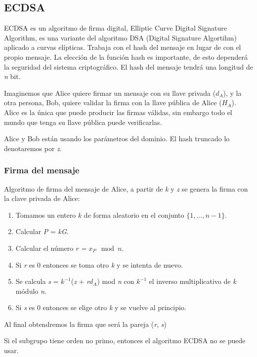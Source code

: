 \documentclass[11pt]{article}
\begin{document}
\subsection{ECDSA}

ECDSA es un algoritmo de firma digital, Elliptic Curve Digital Signature Algorithm, es una variante del algoritmo DSA (Digital Signature Algortihm) aplicado a curvas elípticas. Trabaja con el hash del mensaje en lugar de con el propio mensaje. La elección de la función hash es importante, de esto dependerá la seguridad del sistema criptográfico. El hash del mensaje tendrá una longitud de \textit{n} bit.

Imaginemos que Alice quiere firmar un mensaje con su llave privada ($d_{A}$), y la otra persona, Bob, quiere validar la firma con la llave pública de Alice ($H_{A}$). Alice es la única que puede producir las firmas válidas, sin embargo todo el mundo que tenga su llave pública puede verificarlas.

Alice y Bob están usando los parámetros del dominio. El hash truncado lo denotaremos por \textit{z}.

\subsubsection*{Firma del mensaje}
Algoritmo de firma del mensaje de Alice, a partir de \textit{k} y \textit{z} se genera la firma con la clave privada de Alice:


\begin{enumerate}
	\item Tomamos un entero $ k $ de forma aleatorio en el conjunto $ \{ 1, ..., n-1\} $.
	\item Calcular \textit{P} = \textit{kG}.
	\item Calcular el número \textit{r = $x_{P} \mod n$}.
	\item Si \textit{r} es 0 entonces se toma otro \textit{k} y se intenta de nuevo.
	\item Se calcula \textit{s} = \textit{$k^{-1}$}(\textit{z} + \textit{r$d_{A}$}) mod \textit{n}  con \textit{$k^{-1}$} el inverso multiplicativo de \textit{k} módulo \textit{n}.
	\item Si \textit{s} es 0 entonces se elige otro \textit{k} y se vuelve al principio.
\end{enumerate} 

Al final obtendremos la firma que será la pareja (\textit{r}, \textit{s}) 


Si el subgrupo tiene orden no primo, entonces el algoritmo ECDSA no se puede usar.
\end{document}
